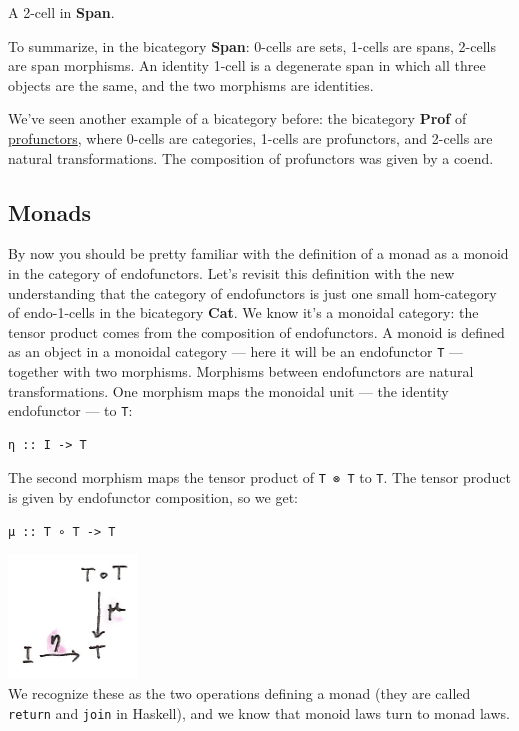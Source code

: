 A 2-cell in \textbf{Span}.

To summarize, in the bicategory \textbf{Span}: 0-cells are sets, 1-cells
are spans, 2-cells are span morphisms. An identity 1-cell is a
degenerate span in which all three objects are the same, and the two
morphisms are identities.

We've seen another example of a bicategory before: the bicategory
\textbf{Prof} of
\href{https://bartoszmilewski.com/2017/03/29/ends-and-coends/}{profunctors},
where 0-cells are categories, 1-cells are profunctors, and 2-cells are
natural transformations. The composition of profunctors was given by a
coend.

\subsection{Monads}\label{monads}

By now you should be pretty familiar with the definition of a monad as a
monoid in the category of endofunctors. Let's revisit this definition
with the new understanding that the category of endofunctors is just one
small hom-category of endo-1-cells in the bicategory \textbf{Cat}. We
know it's a monoidal category: the tensor product comes from the
composition of endofunctors. A monoid is defined as an object in a
monoidal category --- here it will be an endofunctor \texttt{T} ---
together with two morphisms. Morphisms between endofunctors are natural
transformations. One morphism maps the monoidal unit --- the identity
endofunctor --- to \texttt{T}:

\begin{verbatim}
η :: I -> T
\end{verbatim}

The second morphism maps the tensor product of \texttt{T\ ⊗\ T} to
\texttt{T}. The tensor product is given by endofunctor composition, so
we get:

\begin{verbatim}
μ :: T ∘ T -> T
\end{verbatim}

\includegraphics[width=1.35417in]{images/monad.png}\\
We recognize these as the two operations defining a monad (they are
called \texttt{return} and \texttt{join} in Haskell), and we know that
monoid laws turn to monad laws.

